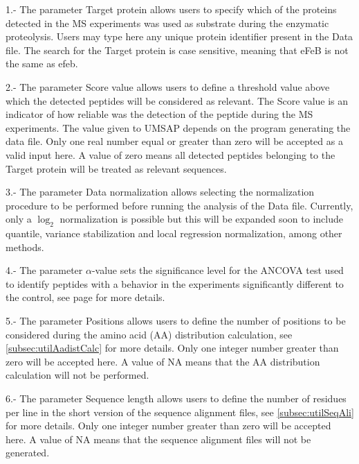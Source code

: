\num{1}.- The parameter Target protein\label{par:tarprotTargetProt} allows users to specify which of the proteins detected in the MS experiments was used as substrate during the enzymatic proteolysis. Users may type here any unique protein identifier present in the Data file. The search for the Target protein is case sensitive, meaning that eFeB is not the same as efeb.

\num{2}.- The parameter Score value\label{par:tarprotScoreValue} allows users to define a threshold value above which the detected peptides will be considered as relevant. The Score value is an indicator of how reliable was the detection of the peptide during the MS experiments. The value given to UMSAP depends on the program generating the data file. Only one real number equal or greater than zero will be accepted as a valid input here. A value of zero means all detected peptides belonging to the Target protein will be treated as relevant sequences.

\num{3}.- The parameter Data normalization allows selecting the normalization procedure to be performed before running the analysis of the Data file. Currently, only a $\log_2$ normalization is possible but this will be expanded soon to include quantile, variance stabilization and local regression normalization, among other methods. 

\num{4}.- The parameter $\alpha$-value sets the significance level for the ANCOVA test used to identify peptides with a behavior in the experiments significantly different to the control, see page \pageref{par:tarprotAncovaTest} for more details.

\num{5}.- The parameter Positions\label{par:tarprotPos} allows users to define the number of positions to be considered during the amino acid (AA) distribution calculation, see \autoref{subsec:utilAadistCalc} for more details. Only one integer number greater than zero will be accepted here. A value of NA means that the AA distribution calculation will not be performed. 

\num{6}.- The parameter Sequence length\label{par:tarprotSeqL} allows users to define the number of residues per line in the short version of the sequence alignment files, see \autoref{subsec:utilSeqAli} for more details. Only one integer number greater than zero will be accepted here. A value of NA means that the sequence alignment files will not be generated.

